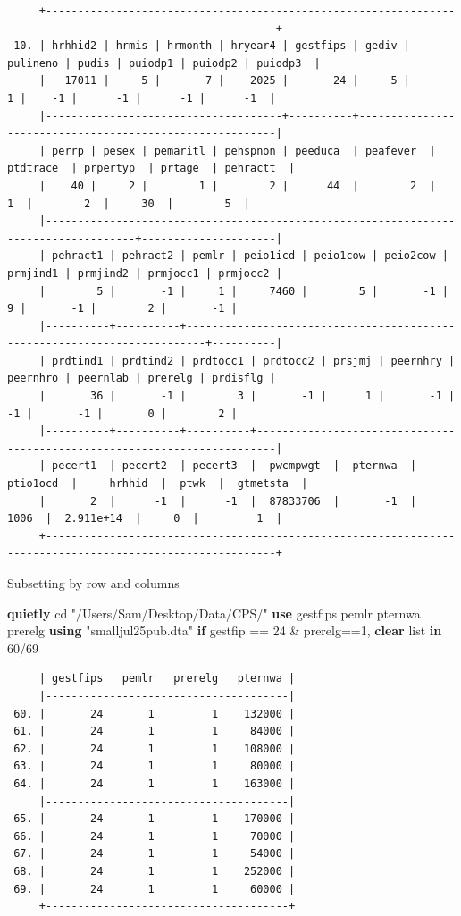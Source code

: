\documentclass[
]{book}
\newenvironment{Shaded}{\begin{snugshade}}{\end{snugshade}}
\newcommand{\KeywordTok}[1]{\textcolor[rgb]{0.13,0.29,0.53}{\textbf{#1}}}
\newcommand{\NormalTok}[1]{#1}
\newcommand{\OtherTok}[1]{\textcolor[rgb]{0.56,0.35,0.01}{#1}}
\newcommand{\StringTok}[1]{\textcolor[rgb]{0.31,0.60,0.02}{#1}}
\begin{document}
\begin{verbatim}
     +----------------------------------------------------------------------------------------------------------+
 10. | hrhhid2 | hrmis | hrmonth | hryear4 | gestfips | gediv | pulineno | pudis | puiodp1 | puiodp2 | puiodp3  |
     |   17011 |     5 |       7 |    2025 |       24 |     5 |        1 |    -1 |      -1 |      -1 |      -1  |
     |-------------------------------------+----------+---------------------------------------------------------|
     | perrp | pesex | pemaritl | pehspnon | peeduca  | peafever  | ptdtrace  | prpertyp  | prtage  | pehractt  |
     |    40 |     2 |        1 |        2 |      44  |        2  |        1  |        2  |     30  |        5  |
     |------------------------------------------------------------------------------------+---------------------|
     | pehract1 | pehract2 | pemlr | peio1icd | peio1cow | peio2cow | prmjind1 | prmjind2 | prmjocc1 | prmjocc2 |
     |        5 |       -1 |     1 |     7460 |        5 |       -1 |        9 |       -1 |        2 |       -1 |
     |----------+----------+-------------------------------------------------------------------------+----------|
     | prdtind1 | prdtind2 | prdtocc1 | prdtocc2 | prsjmj | peernhry | peernhro | peernlab | prerelg | prdisflg |
     |       36 |       -1 |        3 |       -1 |      1 |       -1 |       -1 |       -1 |       0 |        2 |
     |----------+----------+----------+-------------------------------------------------------------------------|
     | pecert1  | pecert2  | pecert3  |  pwcmpwgt  |  pternwa  |  ptio1ocd  |     hrhhid  |  ptwk  |  gtmetsta  |
     |       2  |      -1  |      -1  |  87833706  |       -1  |      1006  |  2.911e+14  |     0  |         1  |
     +----------------------------------------------------------------------------------------------------------+
\end{verbatim}

Subsetting by row and columns

\begin{Shaded}
\begin{Highlighting}[]
\KeywordTok{quietly}\NormalTok{ cd }\StringTok{"/Users/Sam/Desktop/Data/CPS/"}
\KeywordTok{use}\NormalTok{ gestfips pemlr pternwa prerelg }\KeywordTok{using} \StringTok{"smalljul25pub.dta"} \KeywordTok{if}\NormalTok{ gestfip == 24 \& prerelg==1, }\KeywordTok{clear}
\OtherTok{list} \KeywordTok{in}\NormalTok{ 60/69}
\end{Highlighting}
\end{Shaded}

\begin{verbatim}
     | gestfips   pemlr   prerelg   pternwa |
     |--------------------------------------|
 60. |       24       1         1    132000 |
 61. |       24       1         1     84000 |
 62. |       24       1         1    108000 |
 63. |       24       1         1     80000 |
 64. |       24       1         1    163000 |
     |--------------------------------------|
 65. |       24       1         1    170000 |
 66. |       24       1         1     70000 |
 67. |       24       1         1     54000 |
 68. |       24       1         1    252000 |
 69. |       24       1         1     60000 |
     +--------------------------------------+
\end{verbatim}
\end{document}
